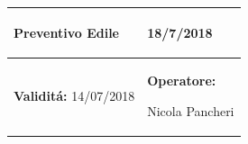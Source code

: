 \documentclass[a4paper]{article}
\begin{document}
                          \begin{center}
                          \begin{tabular}{|L{89mm} R{60mm}| }
                          \hline
                          \vspace{2.5mm}
                          \begin{spacing}{0}
                            \textbf{Preventivo Edile}
                          \end{spacing}&
                          \vspace{2.5mm}
                          \begin{spacing}{0}
        
                     18/7/2018
        
                          \end{spacing}\\
                          \hline
                          \vspace{2.5mm}
                          \begin{spacing}{0}
                            \textbf{Validit\'a:} 14/07/2018
                          \end{spacing} &
                          \vspace{2.5mm}
                          \begin{spacing}{0}
                            \textbf{Operatore:}
        
                       Nicola Pancheri
                          \end{spacing} \\
                          \hline
                          \end{tabular}
                          \end{center}
                        
\end{document}
